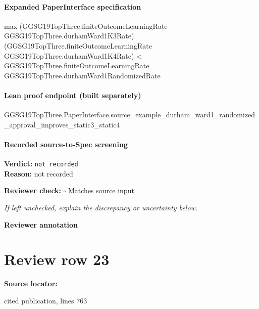 \documentclass[10pt]{article}
\newcommand{\reviewerbox}{%
  \par\noindent\fbox{\parbox{0.96\linewidth}{\rule{0pt}{0.38in}}}\par
}
\newcommand{\reviewmatch}[1]{%
  \par\noindent\textbf{Reviewer check:} $\square$\; #1\par
  \noindent\emph{If left unchecked, explain the discrepancy or uncertainty below.}\par
}
\begin{document}
\paragraph{Expanded PaperInterface specification}
\begin{ReviewVerbatim}
max (GGSG19TopThree.finiteOutcomeLearningRate GGSG19TopThree.durhamWard1K3Rate)
    (GGSG19TopThree.finiteOutcomeLearningRate GGSG19TopThree.durhamWard1K4Rate) <
  GGSG19TopThree.finiteOutcomeLearningRate GGSG19TopThree.durhamWard1RandomizedRate
\end{ReviewVerbatim}

\paragraph{Lean proof endpoint (built separately)}\begin{ReviewVerbatim}
GGSG19TopThree.PaperInterface.source_example_durham_ward1_randomized_approval_improves_static3_static4
\end{ReviewVerbatim}

\paragraph{Recorded source-to-Spec screening}
\textbf{Verdict:} \texttt{not recorded}
\\
\textbf{Reason:} not recorded
\reviewmatch{Matches source input}
\noindent\textbf{Reviewer annotation}\par
\reviewerbox
\clearpage
\hypertarget{source-claim-1b3901556fea513f}{}
\section*{Review row 23}
\textbf{Source locator:} {\footnotesize\raggedright cited publication, lines 763\par}
\end{document}
